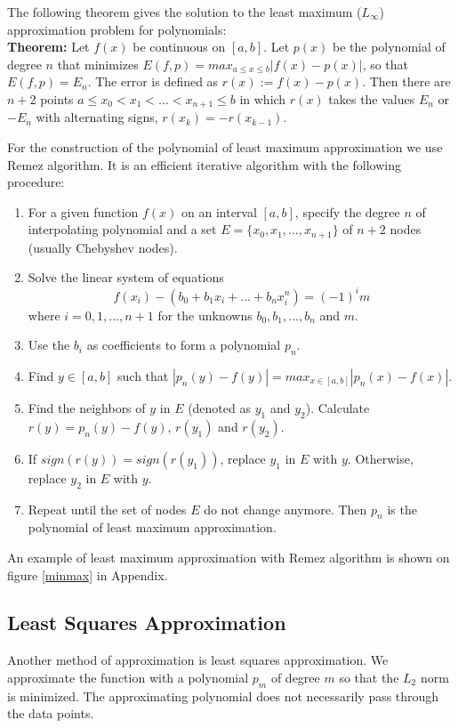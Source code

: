 \documentclass[a4paper,10pt]{article}
\begin{document}
The following theorem gives the solution to the least maximum ($L_\infty$) approximation problem for polynomials: \\
\textbf{Theorem:} Let $f(x)$ be continuous on $[a,b]$. Let $p(x)$ be the polynomial of degree $n$ that minimizes  $E(f,p)=max_{a\leq x\leq b}|f(x)-p(x)|$, so that $E(f,p)=E_n$.
The error is defined as $r(x):=f(x)-p(x)$. Then there are $n+2$ points $a\leq x_0<x_1< \dots<x_{n+1}\leq b$ in which $r(x)$ takes the values $E_n$ or $-E_n$ with alternating signs, $r(x_k)=-r(x_{k-1})$. \cite{Monahan}

For the construction of the polynomial of least maximum approximation we use Remez algorithm. It is an efficient iterative algorithm with the following procedure:\\
\begin{enumerate}
\item{For a given function $f(x)$ on an interval $[a, b]$, specify the degree $n$ of interpolating polynomial and a set $E=\{x_0,x_1,...,x_{n+1}\}$ of $n+2$ nodes (usually Chebyshev nodes).}
\item{Solve the linear system of equations $$f(x_i)-(b_0+b_1x_i+...+b_nx_i^n)=(-1)^im$$ where $i=0,1,...,n+1$ for the unknowns $b_0,b_1,...,b_n$ and $m$.}
\item{Use the $b_{i}$ as coefficients to form a polynomial $p_{n}$.}
\item{Find $y \in [a,b]$ such that $|p_{n}(y)-f(y)| =max_{x \in [a,b]}|p_{n}(x)-f(x)|$.}
\item{Find the neighbors of $y$ in $E$ (denoted as $y_1$ and $y_2$). Calculate $r(y)=p_{n}(y)-f(y)$, $r(y_1)$ and $r(y_2)$.}
\item{If $sign(r(y))=sign(r(y_1))$, replace $y_1$ in $E$ with $y$. Otherwise, replace $y_2$ in $E$ with $y$.}
\item{Repeat until the set of nodes $E$ do not change anymore. Then $p_{n}$ is the polynomial of least maximum approximation. \cite{remez}}
\end{enumerate}
An example of least maximum approximation with Remez algorithm is shown on figure \ref{minmax} in Appendix.

\subsection{Least Squares Approximation}
Another method of approximation is least squares approximation. We approximate the function with a polynomial $p_m$ of degree $m$ so that the $L_2$ norm is minimized. The approximating polynomial does not necessarily pass through the data points. \cite{Woodford}
\end{document}
